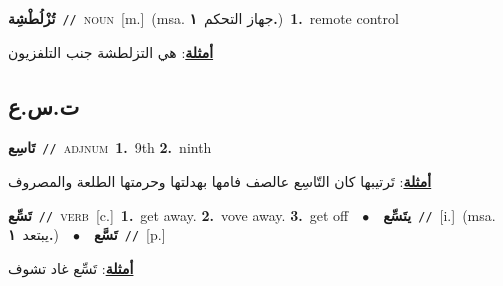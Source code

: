 \documentclass[10pt,a4paper,twoside]{article} %
\begin{document}
\begin{multicols}{2}
{{{{{{{{{{{\setlength\topsep{0pt}\textbf{\foreignlanguage{arabic}{تُزْلُطْشِة}}\ {\color{gray}\texttt{//}\color{black}}\ \textsc{noun}\ [m.]\ \color{gray}(msa. \foreignlanguage{arabic}{جهاز التحكم}~\foreignlanguage{arabic}{\textbf{١.}})\color{black}\ \textbf{1.}~remote control\  \begin{flushright}\color{gray}\foreignlanguage{arabic}{\textbf{\underline{\foreignlanguage{arabic}{أمثلة}}}: هي التزلطشة جنب التلفزيون}\end{flushright}\color{black}} \vspace{2mm}

\vspace{-3mm}
\subsection*{\color{blue}\foreignlanguage{arabic}{ت.س.ع}\color{blue}{}} 

{\setlength\topsep{0pt}\textbf{\foreignlanguage{arabic}{تَاسِع}}\ {\color{gray}\texttt{//}\color{black}}\ \textsc{adj\textunderscore num}\ \textbf{1.}~9th  \textbf{2.}~ninth\  \begin{flushright}\color{gray}\foreignlanguage{arabic}{\textbf{\underline{\foreignlanguage{arabic}{أمثلة}}}: تَرتيبها كان التّاسِع عالصف فامها بهدلتها وحرمتها الطلعة والمصروف}\end{flushright}\color{black}} \vspace{2mm}

{\setlength\topsep{0pt}\textbf{\foreignlanguage{arabic}{تَسِّع}}\ {\color{gray}\texttt{//}\color{black}}\ \textsc{verb}\ [c.]\ \textbf{1.}~get away.  \textbf{2.}~vove away.  \textbf{3.}~get off\ \ $\bullet$\ \ \setlength\topsep{0pt}\textbf{\foreignlanguage{arabic}{يتَسِّع}}\ {\color{gray}\texttt{//}\color{black}}\ [i.]\ \color{gray}(msa. \foreignlanguage{arabic}{يبتعد}~\foreignlanguage{arabic}{\textbf{١.}})\color{black}\ \ $\bullet$\ \ \setlength\topsep{0pt}\textbf{\foreignlanguage{arabic}{تَسَّع}}\ {\color{gray}\texttt{//}\color{black}}\ [p.]\  \begin{flushright}\color{gray}\foreignlanguage{arabic}{\textbf{\underline{\foreignlanguage{arabic}{أمثلة}}}: تَسِّع غاد تشوف}\end{flushright}\color{black}} \vspace{2mm}

}}}}}}}}}}
\end{multicols}
\end{document}
